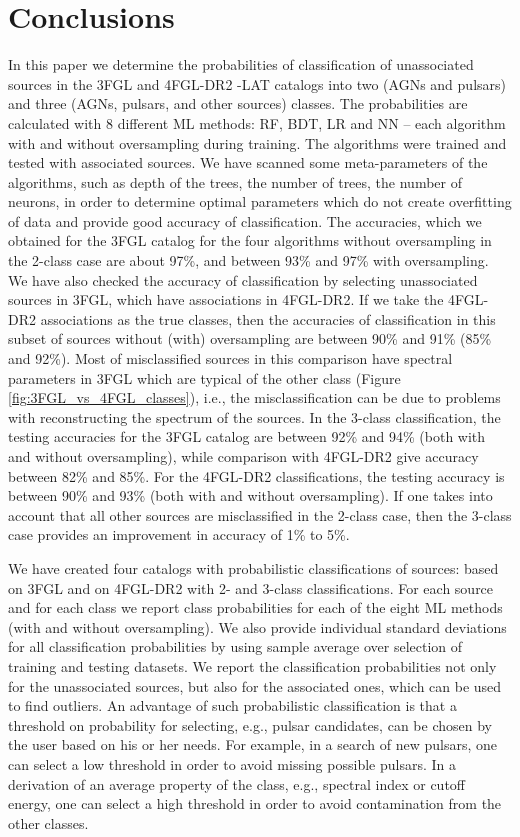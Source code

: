 \section{Conclusions}

In this paper we determine the probabilities of classification of unassociated sources in the 3FGL and 4FGL-DR2 \Fermi-LAT catalogs
into two (AGNs and pulsars) and three (AGNs, pulsars, and other sources) classes.
The probabilities are calculated with 8 different ML methods: RF, BDT, LR and NN -- each algorithm with and without oversampling during training.
The algorithms were trained and tested with associated sources.
We have scanned some meta-parameters of the algorithms, such as depth of the trees, the number of trees, the number of neurons, in order to determine optimal parameters which do not create overfitting of data and provide good accuracy of classification.
The accuracies, which we obtained for the 3FGL catalog for the four algorithms without oversampling in the 2-class case are about 97\%, and between 93\% and 97\% with oversampling.
We have also checked the accuracy of classification by selecting unassociated sources in 3FGL, which have associations in 4FGL-DR2.
If we take the 4FGL-DR2 associations as the true classes, then the accuracies of classification in this subset of sources 
without (with) oversampling are between 90\% and 91\% (85\% and 92\%).
Most of misclassified sources in this comparison have spectral parameters in 3FGL which are typical of the other class (Figure \ref{fig:3FGL_vs_4FGL_classes}), i.e.,  the misclassification can be due to problems with reconstructing the spectrum of the sources.
In the 3-class classification, the testing accuracies for the 3FGL catalog are between 92\% and 94\% (both with and without oversampling), while comparison with 4FGL-DR2 give accuracy between 82\% and 85\%. For the 4FGL-DR2 classifications, the testing accuracy is between 90\% and 93\% (both with and without oversampling). If one takes into account that all other sources are misclassified in the 2-class case, then the 3-class case provides an improvement in accuracy of 1\% to 5\%.

We have created four catalogs with probabilistic classifications of sources: based on 3FGL and on 4FGL-DR2 with 2- and 3-class classifications.
For each source and for each class we report class probabilities for each of the eight ML methods (with and without oversampling). 
We also provide individual standard deviations for all classification probabilities by using sample average over selection of training and testing datasets.
We report the classification probabilities not only for the unassociated sources, but also for the associated ones, which can be used to find outliers.
An advantage of such probabilistic classification is that a threshold on probability for selecting, e.g., pulsar candidates, can be chosen by the user based on his or her needs.
For example, in a search of new pulsars, one can select a low threshold in order to avoid missing possible pulsars.
In a derivation of an average property of the class, e.g., spectral index or cutoff energy, one can select a high threshold in order to avoid contamination from the other classes.


